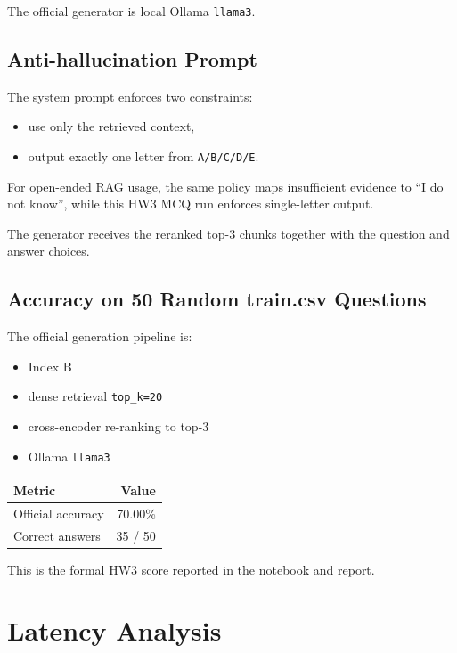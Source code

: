 \documentclass[12pt,a4paper]{article}
\begin{document}
The official generator is local Ollama \texttt{llama3}.

\subsection{Anti-hallucination Prompt}

The system prompt enforces two constraints:

\begin{itemize}
    \item use only the retrieved context,
    \item output exactly one letter from \texttt{A/B/C/D/E}.
\end{itemize}

For open-ended RAG usage, the same policy maps insufficient evidence to ``I do not know'', while this HW3 MCQ run enforces single-letter output.

The generator receives the reranked top-3 chunks together with the question and answer choices.

\subsection{Accuracy on 50 Random train.csv Questions}

The official generation pipeline is:

\begin{itemize}
    \item Index B
    \item dense retrieval \texttt{top\_k=20}
    \item cross-encoder re-ranking to top-3
    \item Ollama \texttt{llama3}
\end{itemize}

\begin{table}[H]
\centering
\begin{tabular}{lr}
\toprule
\textbf{Metric} & \textbf{Value} \\
\midrule
Official accuracy & 70.00\% \\
Correct answers & 35 / 50 \\
\bottomrule
\end{tabular}
\end{table}

This is the formal HW3 score reported in the notebook and report.

\section{Latency Analysis}
\end{document}

